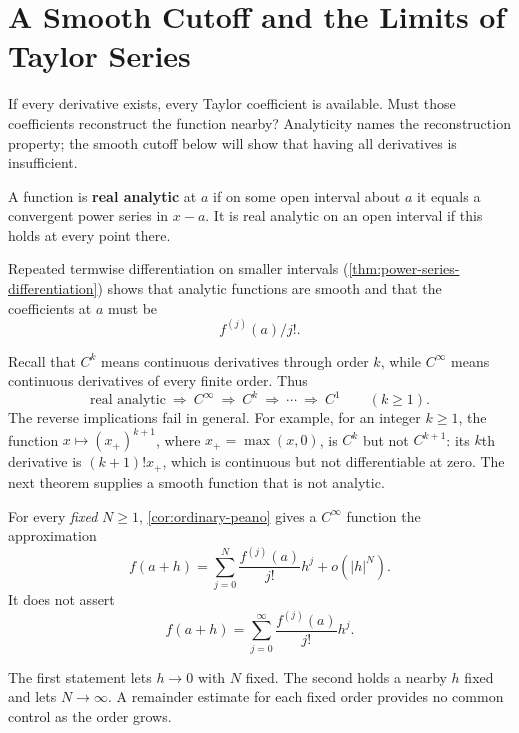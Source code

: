 \section{A Smooth Cutoff and the Limits of Taylor Series}
If every derivative exists, every Taylor coefficient is available. Must
those coefficients reconstruct the function nearby? Analyticity names
the reconstruction property; the smooth cutoff below will show that
having all derivatives is insufficient.
\begin{definition}\label{def:ordinary-analytic}
A function is \textbf{real analytic} at $a$ if on some open interval
about $a$ it equals a convergent power series in $x-a$. It is real
analytic on an open interval if this holds at every point there.
\end{definition}
Repeated termwise differentiation on smaller intervals
(\cref{thm:power-series-differentiation}) shows that analytic functions
are smooth and that the coefficients at $a$ must be
\[
f^{(j)}(a)/j!.
\]

Recall that $C^k$ means continuous derivatives through order $k$, while
$C^\infty$ means continuous derivatives of every finite order. Thus
\[
\text{real analytic}\ \Longrightarrow\ C^\infty\ \Longrightarrow\ C^k
\ \Longrightarrow\ \cdots\ \Longrightarrow\ C^1\qquad(k\geq1).
\]
The reverse implications fail in general. For example, for an integer
$k\geq1$, the function $x\mapsto(x_+)^{k+1}$, where
$x_+=\max(x,0)$, is $C^k$ but not $C^{k+1}$: its $k$th derivative
is $(k+1)!x_+$, which is continuous but not differentiable at zero.
The next theorem supplies a smooth function that is not analytic.

For every \emph{fixed} $N\geq1$, \cref{cor:ordinary-peano} gives a
$C^\infty$ function the approximation
\[
f(a+h)=\sum_{j=0}^N\frac{f^{(j)}(a)}{j!}h^j+o(|h|^N).
\]
It does not assert
\[
f(a+h)=\sum_{j=0}^\infty\frac{f^{(j)}(a)}{j!}h^j.
\]

The first statement lets $h\to0$ with $N$ fixed. The second holds a
nearby $h$ fixed and lets $N\to\infty$. A remainder estimate for each
fixed order provides no common control as the order grows.

